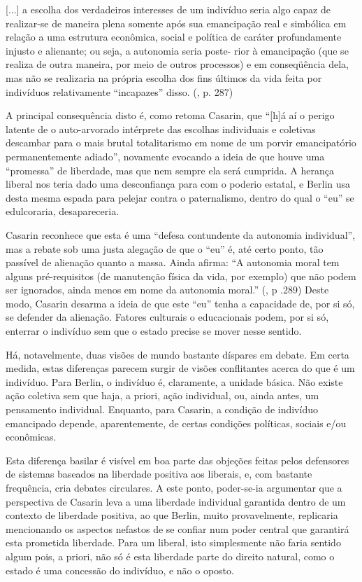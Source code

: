 \documentclass[12pt,a4paper]{article}
\newenvironment{citac}
{
	
	\par\setlength{\leftskip}{4cm}\noindent\ignorespaces
	\footnotesize}{\normalfont
	\par

}
\begin{document}
	\begin{citac}
		[...] a escolha dos verdadeiros interesses
		de um indivíduo seria algo capaz de realizar-se de
		maneira plena somente após sua emancipação real
		e simbólica em relação a uma estrutura econômica, 
		social e política de caráter profundamente injusto 
		e alienante; ou seja, a autonomia seria poste-
		rior à emancipação (que se realiza de outra maneira, 
		por meio de outros processos) e em conseqüência dela, 
		mas não se realizaria na própria escolha dos fins 
		últimos da vida feita por indivíduos relativamente 
		“incapazes” disso. (\cite{casarin}, p. 287)
	\end{citac}

	A principal consequência disto é, como retoma Casarin, que 
	“[h]á aí o perigo latente de o auto-arvorado intérprete das
	escolhas individuais e coletivas descambar para o mais brutal 
	totalitarismo em nome de um porvir emancipatório 
	permanentemente adiado”, novamente evocando a ideia de que houve uma 
	“promessa” de liberdade, mas que nem sempre ela será cumprida. 
	A herança liberal nos teria dado uma desconfiança para com o poderio 
	estatal, e Berlin usa desta mesma espada para pelejar contra o 
	paternalismo, dentro do qual o “eu” se edulcoraria, desapareceria. 

	Casarin reconhece que esta é uma “defesa contundente da autonomia 
	individual”, mas a rebate sob uma justa alegação de que o “eu” é, 
	até certo ponto, tão passível de alienação quanto a massa. Ainda 
	afirma: “A autonomia moral tem alguns pré-requisitos (de
	manutenção física da vida, por exemplo) que não podem ser ignorados, 
	ainda menos em nome da autonomia moral.” (\cite{casarin}, p .289)
	Deste modo, Casarin desarma a ideia de que este “eu” tenha a 
	capacidade de, por si só, se defender da alienação. Fatores 
	culturais o educacionais podem, por si só, enterrar o indivíduo 
	sem que o estado precise se mover nesse sentido. 

	Há, notavelmente, duas visões de mundo bastante díspares em debate. 
	Em certa medida, estas diferenças parecem surgir de visões 
	conflitantes acerca do que é um indivíduo. Para Berlin, o indivíduo 
	é, claramente, a unidade básica. Não existe ação coletiva sem que 
	haja, a priori, ação individual, ou, ainda antes, um pensamento 
	individual. Enquanto, para Casarin, a condição de indivíduo 
	emancipado depende, aparentemente, de certas condições políticas, 
	sociais e/ou econômicas. 

	Esta diferença basilar é visível em boa parte das objeções feitas 
	pelos defensores de sistemas baseados na liberdade positiva aos 
	liberais, e, com bastante frequência, cria debates circulares. A 
	este ponto, poder-se-ia argumentar que a perspectiva de Casarin 
	leva a uma liberdade individual garantida dentro de um contexto de 
	liberdade positiva, ao que Berlin, muito provavelmente, replicaria 
	mencionando os aspectos nefastos de se confiar num poder central 
	que garantirá esta prometida liberdade. Para um liberal, isto 
	simplesmente não faria sentido algum pois, a priori, não só é 
	esta liberdade parte do direito natural, como o estado é uma 
	concessão do indivíduo, e não o oposto. 
\end{document}
